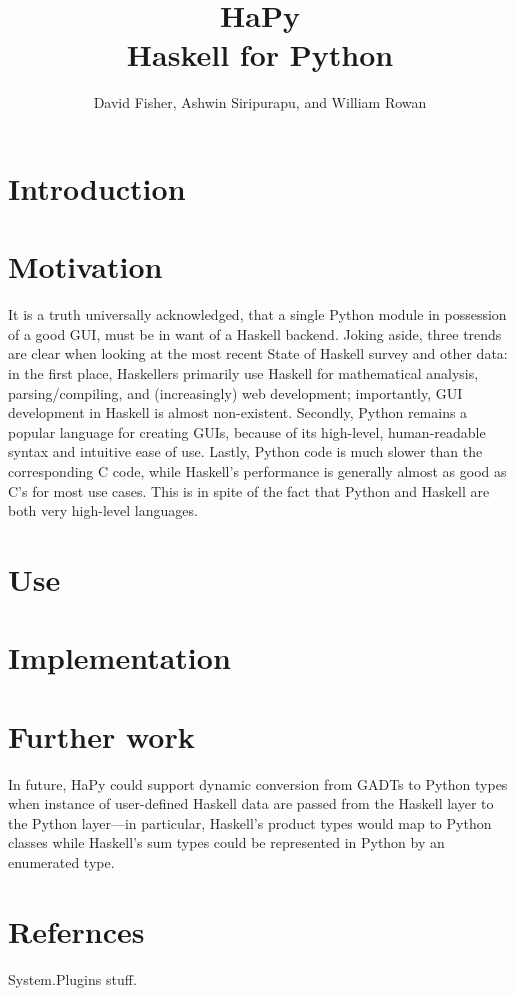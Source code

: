 \documentclass[11pt, letterpaper, oneside, twocolumn] {article}
\begin{document}
\title{HaPy \\
Haskell for Python
}
\author{David Fisher, Ashwin Siripurapu, and William Rowan}
\maketitle

\section{Introduction}

\section{Motivation}
It is a truth universally acknowledged, that a single Python module in possession of a good GUI, must be in want of a Haskell backend. Joking aside, three trends are clear when looking at the most recent State of Haskell survey and other data: in the first place, Haskellers primarily use Haskell for mathematical analysis, parsing/compiling, and (increasingly) web development; importantly, GUI development in Haskell is almost non-existent. Secondly, Python remains a popular language for creating GUIs, because of its high-level, human-readable syntax and intuitive ease of use. Lastly, Python code is much slower than the corresponding C code, while Haskell's performance is generally almost as good as C's for most use cases. This is in spite of the fact that Python and Haskell are both very high-level languages. 

\section{Use}

\section{Implementation}

\section{Further work}
In future, HaPy could support dynamic conversion from GADTs to Python types when instance of user-defined Haskell data are passed from the Haskell layer to the Python layer---in particular, Haskell's product types would map to Python classes while Haskell's sum types could be represented in Python by an enumerated type. 

\section{Refernces}
System.Plugins stuff.
\end{document}
